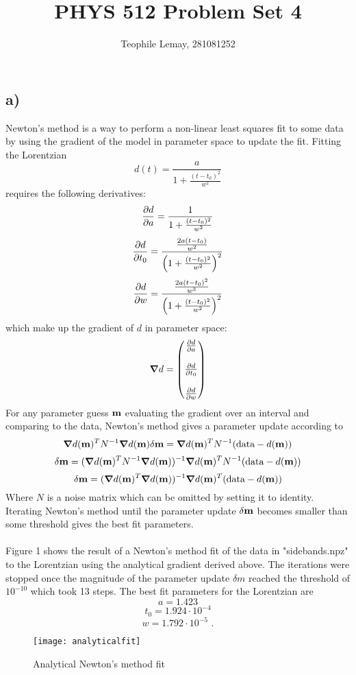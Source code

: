 \documentclass{article}
\title{PHYS 512 Problem Set 4}
\author{Teophile Lemay, 281081252}
\date{}
\newcommand{\<}[1]{\left\langle #1 \right\rangle }
\begin{document}
\maketitle
	
\section{}
\subsection{a)}
Newton's method is a way to perform a non-linear least squares fit to some data by using the gradient of the model in parameter space to update the fit. Fitting the Lorentzian 
\[d(t) = \frac{a}{1 + \frac{(t-t_0)^2}{w^2}}\] 
requires the following derivatives:
\[ \pdv{d}{a} = \frac{1}{1 + \frac{(t-t_0)^2}{w^2}} \]
\[ \pdv{d}{t_0} = \frac{ \frac{2a(t-t_0)}{w^2} }{ \left( 1 + \frac{(t-t_0)^2}{w^2} \right)^2 } \]
\[ \pdv{d}{w} = \frac{ \frac{2a(t-t_0)^2}{w^3} }{ \left( 1 + \frac{(t-t_0)^2}{w^2} \right)^2 } \]
which make up the gradient of $d$ in parameter space:
\[\grad{d} = 
\begin{pmatrix}
	\pdv{d}{a} \\\\
	
	\pdv{d}{t_0} \\\\
	
	\pdv{d}{w}
\end{pmatrix}\]
For any parameter guess $\vb{m}$ evaluating the gradient over an interval and comparing to the data, Newton's method gives a parameter update according to
\[ \grad{d(\vb{m})}^T N^{-1} \grad{d(\vb{m})} \delta \vb{m} = \grad{d(\vb{m})}^T N^{-1} (\text{data} - d(\vb{m}))\]
\[ \delta\vb{m} = (\grad{d(\vb{m})}^T N^{-1} \grad{d(\vb{m})})^{-1}\grad{d(\vb{m})}^T N^{-1} (\text{data} - d(\vb{m})) \]
\[ \delta\vb{m} = (\grad{d(\vb{m})}^T \grad{d(\vb{m})})^{-1}\grad{d(\vb{m})}^T (\text{data} - d(\vb{m})) \]
Where $N$ is a noise matrix which can be omitted by setting it to identity. Iterating Newton's method until the parameter update $\delta \vb{m}$ becomes smaller than some threshold gives the best fit parameters.\\
\\
Figure 1 shows the result of a Newton's method fit of the data in "sidebands.npz" to the Lorentzian using the analytical gradient derived above. The iterations were stopped once the magnitude of the parameter update $\delta m$ reached the threshold of $10^{-10}$ which took 13 steps. The best fit parameters for the Lorentzian are
\[a = 1.423\]
\[t_0 = 1.924 \cdot 10^{-4}\]
\[w = 1.792 \cdot 10^{-5} \text{ .}\]
\begin{figure}[h]
	\caption{Analytical Newton's method fit}
	\centering
	\texttt{[image: analyticalfit]}
\end{figure}
\end{document}
